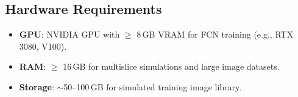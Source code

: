 \documentclass[11pt,a4paper]{article}
\begin{document}
\subsection{Hardware Requirements}
\begin{itemize}
  \item \textbf{GPU}: NVIDIA GPU with $\geq$ 8\,GB VRAM for FCN training (e.g., RTX 3080, V100).
  \item \textbf{RAM}: $\geq$ 16\,GB for multislice simulations and large image datasets.
  \item \textbf{Storage}: $\sim$50--100\,GB for simulated training image library.
\end{itemize}
\end{document}
